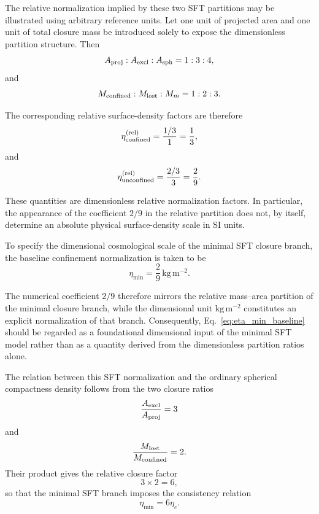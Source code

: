 \documentclass[12pt]{article}
\begin{document}
The relative normalization implied by these two SFT partitions may be
illustrated using arbitrary reference units. Let one unit of projected
area and one unit of total closure mass be introduced solely to expose
the dimensionless partition structure. Then
\begin{equation}
A_{\rm proj}:A_{\rm excl}:A_{\rm sph}
=
1:3:4,
\end{equation}
and
\begin{equation}
M_{\rm confined}:M_{\rm lost}:M_m
=
1:2:3.
\end{equation}

The corresponding relative surface-density factors are therefore
\begin{equation}
\eta_{\rm confined}^{(\rm rel)}
=
\frac{1/3}{1}
=
\frac13,
\end{equation}
and
\begin{equation}
\eta_{\rm unconfined}^{(\rm rel)}
=
\frac{2/3}{3}
=
\frac29.
\end{equation}

These quantities are dimensionless relative normalization factors.
In particular, the appearance of the coefficient $2/9$ in the relative
partition does not, by itself, determine an absolute physical
surface-density scale in SI units.

To specify the dimensional cosmological scale of the minimal SFT closure
branch, the baseline confinement normalization is taken to be
\begin{equation}
\boxed{
\eta_{\min}
=
\frac{2}{9}\,\mathrm{kg\,m^{-2}}.
}
\label{eq:eta_min_baseline}
\end{equation}

The numerical coefficient $2/9$ therefore mirrors the relative
mass--area partition of the minimal closure branch, while the dimensional
unit $\mathrm{kg\,m^{-2}}$ constitutes an explicit normalization of that
branch. Consequently, Eq.~\eqref{eq:eta_min_baseline} should be regarded
as a foundational dimensional input of the minimal SFT model rather than
as a quantity derived from the dimensionless partition ratios alone.

The relation between this SFT normalization and the ordinary spherical
compactness density follows from the two closure ratios
\begin{equation}
\frac{A_{\rm excl}}{A_{\rm proj}}=3
\end{equation}
and
\begin{equation}
\frac{M_{\rm lost}}{M_{\rm confined}}=2.
\end{equation}
Their product gives the relative closure factor
\begin{equation}
3\times2=6,
\end{equation}
so that the minimal SFT branch imposes the consistency relation
\begin{equation}
\boxed{
\eta_{\min}=6\eta_c.
}
\label{eq:eta_min_relation}
\end{equation}
\end{document}
